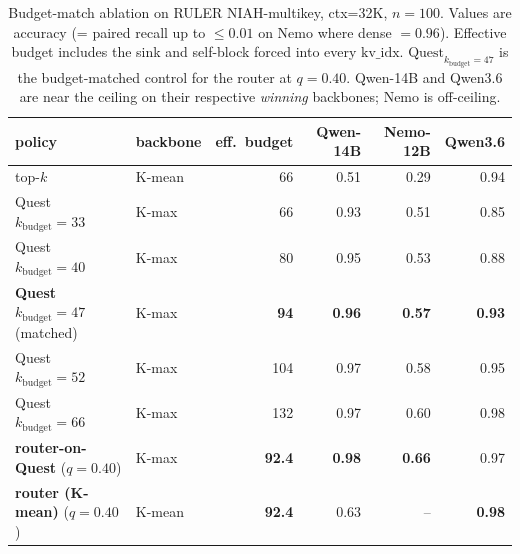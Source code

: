 \documentclass[11pt]{article}
\theoremstyle{remark}
\newcommand{\kbudget}{k_{\text{budget}}}
\begin{document}
\begin{table}[h]
\centering\small
\caption{Budget-match ablation on RULER NIAH-multikey, ctx=32K, $n=100$. Values are accuracy (= paired recall up to $\le 0.01$ on Nemo where dense $=0.96$). Effective budget includes the sink and self-block forced into every $\text{kv\_idx}$. $\text{Quest}_{\kbudget=47}$ is the budget-matched control for the router at $q=0.40$. Qwen-14B and Qwen3.6 are near the ceiling on their respective \emph{winning} backbones; Nemo is off-ceiling.}\label{tab:budget-match}
\begin{tabular}{llrrrr}
\toprule
policy & backbone & eff.\ budget & Qwen-14B & Nemo-12B & Qwen3.6 \\
\midrule
top-$k$                              & K-mean & 66    & 0.51 & 0.29 & 0.94 \\
Quest $\kbudget=33$                  & K-max  & 66    & 0.93 & 0.51 & 0.85 \\
Quest $\kbudget=40$                  & K-max  & 80    & 0.95 & 0.53 & 0.88 \\
\textbf{Quest $\kbudget=47$} (matched) & K-max  & \textbf{94}   & \textbf{0.96} & \textbf{0.57} & \textbf{0.93} \\
Quest $\kbudget=52$                  & K-max  & 104   & 0.97 & 0.58 & 0.95 \\
Quest $\kbudget=66$                  & K-max  & 132   & 0.97 & 0.60 & 0.98 \\
\textbf{router-on-Quest} ($q=0.40$)  & K-max  & \textbf{92.4} & \textbf{0.98} & \textbf{0.66} & 0.97 \\
\textbf{router (K-mean)} ($q=0.40$)  & K-mean & \textbf{92.4} & 0.63 & --   & \textbf{0.98} \\
\bottomrule
\end{tabular}
\end{table}
\end{document}

